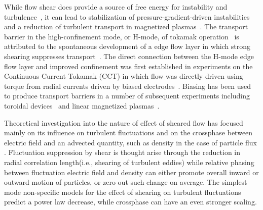 \documentclass[aps,prl,amsmath,amssymb,preprint,superscriptaddress]{revtex4}
\begin{document}

While flow shear does provide a source of free energy for instability and turbulence~\cite{}, it can lead to stabilization of pressure-gradient-driven instabilities and a reduction of turbulent transport in magnetized plasmas~\cite{}.  The transport barrier in the high-confinement mode, or H-mode, of tokamak operation~\cite{wagner82} is attributed to the spontaneous development of a edge flow layer in which  strong shearing suppresses transport~\cite{burrell, terry, hahm?}. 
The direct connection between the H-mode edge flow layer and improved confinement was first established in experiments on the Continuous Current Tokamak (CCT) in which flow was directly driven using torque from radial currents driven by biased electrodes~\cite{taylor89,tynan92}.  Biasing has been used to produce transport barriers in a number of subsequent experiments including toroidal devices~\cite{boedo00,RFP,Stell,TJK, etc} and linear magnetized plasmas~\cite{maggs07,carter09,mirror}.  





Theoretical investigation into the nature of effect of sheared flow has focused mainly on its influence on turbulent fluctuations \cite{biglari90} and on the crossphase between electric field and an advected quantity, such as density in the case of particle flux \cite{ware96,terry01}. Fluctuation suppression by shear is thought arise through the reduction in radial correlation length(i.e., shearing of turbulent eddies) while relative phasing between fluctuation electric field and density can either promote overall inward or outward motion of particles, or zero out such change on average. The simplest mode non-specific models for the effect of shearing on turbulent fluctuations predict a power law decrease\cite{biglari90}, while crossphase can have an even stronger scaling\cite{terry01}.
\end{document}
